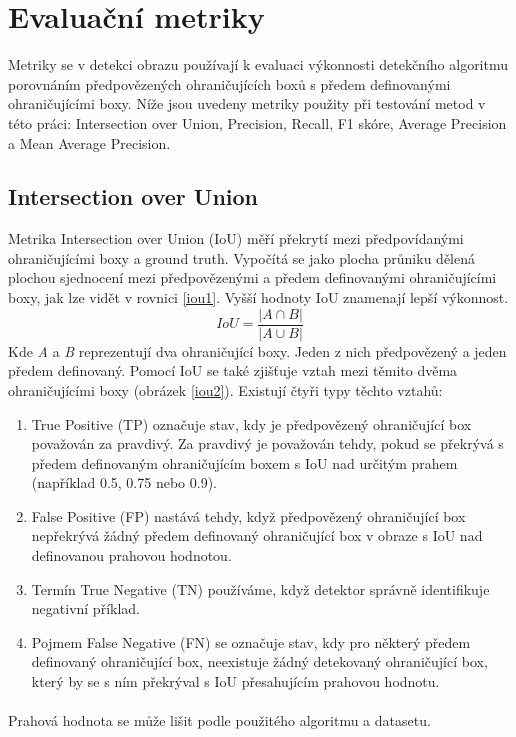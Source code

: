 \section{Evaluační metriky}
Metriky se v detekci obrazu používají k evaluaci výkonnosti detekčního algoritmu porovnáním předpovězených ohraničujících boxů s předem definovanými ohraničujícími boxy. Níže jsou uvedeny metriky použity při testování metod v této práci: Intersection over Union, Precision, Recall, F1 skóre, Average Precision a Mean Average Precision.

\subsection*{Intersection over Union}
Metrika Intersection over Union (IoU) \cite{iou} měří překrytí mezi předpovídanými ohraničujícími boxy a ground truth. Vypočítá se jako plocha průniku dělená plochou sjednocení mezi předpovězenými a předem definovanými ohraničujícími boxy, jak lze vidět v rovnici \ref{iou1}. Vyšší hodnoty IoU znamenají lepší výkonnost.
\begin{equation}\label{iou1}
I o U=\frac{|A \cap B|}{|A \cup B|}
\end{equation}
Kde \textit{A} a \textit{B} reprezentují dva ohraničující boxy. Jeden z nich předpovězený a jeden předem definovaný. 
Pomocí IoU se také zjišťuje vztah mezi těmito dvěma ohraničujícími boxy (obrázek \ref{iou2}). Existují čtyři typy těchto vztahů:
\begin{enumerate}
    \item True Positive (TP) označuje stav, kdy je předpovězený ohraničující box považován za pravdivý. Za pravdivý je považován tehdy, pokud se překrývá s předem definovaným ohraničujícím boxem s IoU nad určitým prahem (například 0.5, 0.75 nebo 0.9).
    \item False Positive (FP) nastává tehdy, když předpovězený ohraničující box nepřekrývá žádný předem definovaný ohraničující box v obraze s IoU nad definovanou prahovou hodnotou.
    \item Termín True Negative (TN) používáme, když detektor správně identifikuje negativní příklad.
    \item Pojmem False Negative (FN) se označuje stav, kdy pro některý předem definovaný ohraničující box, neexistuje žádný detekovaný ohraničující box, který by se s ním překrýval s IoU přesahujícím prahovou hodnotu.  
\end{enumerate}
\paragraph{} Prahová hodnota se může lišit podle použitého algoritmu a datasetu.



